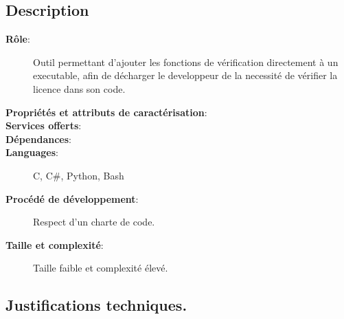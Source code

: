\subsection{Description}
\begin{description}
	\item[\textbf{Rôle}:]
			Outil permettant d'ajouter les fonctions de vérification directement à un
			executable, afin de décharger le developpeur de la necessité de vérifier 
			la licence dans son code.
	\item[\textbf{Propriétés et attributs de caractérisation}:]
	\item[\textbf{Services offerts}:]
	\item[\textbf{Dépendances}:]
	\item[\textbf{Languages}:]
		C, C\#, Python, Bash 
	\item[\textbf{Procédé de développement}:]
		Respect d'un charte de code. 
	\item[\textbf{Taille et complexité}:]
		Taille faible et complexité élevé.
\end{description}

\subsection{Justifications techniques.}

